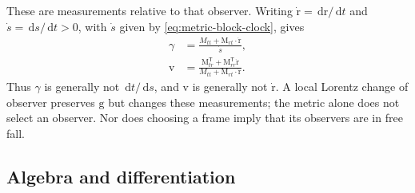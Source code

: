 \documentclass[11pt]{article}
\newcommand{\vstyle}[1]{{\bm{\mathrm{#1}}}}
\numberwithin{equation}{section}
\newcommand{\dotprod}{\cdot}
\newcommand{\br}{\vstyle{r}}
\newcommand{\bv}{\vstyle{v}}
\newcommand{\bg}{\vstyle{g}}
\newcommand{\bM}{\vstyle{M}}
\newcommand{\dd}{\,\mathrm d}
\begin{document}
These are measurements relative to that observer. Writing
$\dot\br=\dd\br/\dd t$ and $\dot s=\dd s/\dd t>0$, with $\dot s$
given by \eqref{eq:metric-block-clock}, gives
\begin{equation}
 \boxed{\begin{aligned}
 \gamma&=\frac{M_{tt}+\bM_{rt}\dotprod\dot\br}{\dot s},\\
 \bv&=\frac{\bM_{tr}^{\mathsf T}+\bM_{rr}^{\mathsf T}\dot\br}
               {M_{tt}+\bM_{rt}\dotprod\dot\br}.
 \end{aligned}}
 \label{eq:coordinate-local-velocity}
\end{equation}
Thus $\gamma$ is generally not $\dd t/\dd s$, and $\bv$ is generally
not $\dot\br$. A local Lorentz change of observer preserves $\bg$ but
changes these measurements; the metric alone does not select an observer.
Nor does choosing a frame imply that its observers are in free fall.

\subsection{Algebra and differentiation}
\end{document}
